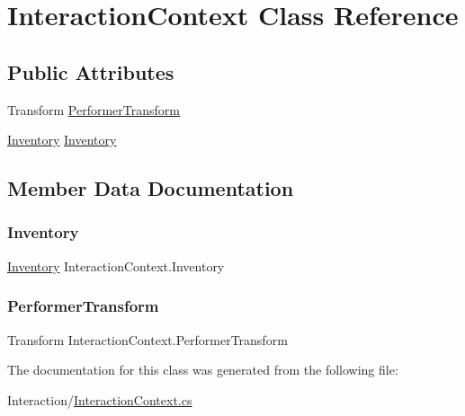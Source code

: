 \hypertarget{class_interaction_context}{}\section{Interaction\+Context Class Reference}
\label{class_interaction_context}
\subsection*{Public Attributes}
\begin{DoxyCompactItemize}
\item 
Transform \mbox{\hyperlink{class_interaction_context_a0b33baa8e35750642dd6f688025945d1}{Performer\+Transform}}
\item 
\mbox{\hyperlink{class_inventory}{Inventory}} \mbox{\hyperlink{class_interaction_context_a86a27d7440667629be6769b1fb77a4f0}{Inventory}}
\end{DoxyCompactItemize}


\subsection{Member Data Documentation}
\mbox{\label{class_interaction_context_a86a27d7440667629be6769b1fb77a4f0}} 
\subsubsection{\texorpdfstring{Inventory}{Inventory}}
{\footnotesize\ttfamily \mbox{\hyperlink{class_inventory}{Inventory}} Interaction\+Context.\+Inventory}

\mbox{\label{class_interaction_context_a0b33baa8e35750642dd6f688025945d1}} 
\subsubsection{\texorpdfstring{Performer\+Transform}{PerformerTransform}}
{\footnotesize\ttfamily Transform Interaction\+Context.\+Performer\+Transform}



The documentation for this class was generated from the following file\+:\begin{DoxyCompactItemize}
\item 
Interaction/\mbox{\hyperlink{_interaction_context_8cs}{Interaction\+Context.\+cs}}\end{DoxyCompactItemize}
